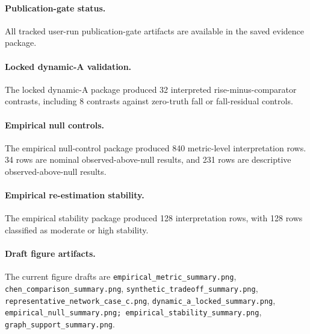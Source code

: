 \paragraph{Publication-gate status.}
All tracked user-run publication-gate artifacts are available in the saved evidence package.

\paragraph{Locked dynamic-A validation.}
The locked dynamic-A package produced 32 interpreted rise-minus-comparator contrasts, including 8 contrasts against zero-truth fall or fall-residual controls.

\paragraph{Empirical null controls.}
The empirical null-control package produced 840 metric-level interpretation rows. 34 rows are nominal observed-above-null results, and 231 rows are descriptive observed-above-null results.

\paragraph{Empirical re-estimation stability.}
The empirical stability package produced 128 interpretation rows, with 128 rows classified as moderate or high stability.

\paragraph{Draft figure artifacts.}
The current figure drafts are \texttt{empirical\_metric\_summary.png}, \texttt{chen\_comparison\_summary.png}, \texttt{synthetic\_tradeoff\_summary.png}, \texttt{representative\_network\_case\_c.png}, \texttt{dynamic\_a\_locked\_summary.png}, \texttt{empirical\_null\_summary.png; empirical\_stability\_summary.png}, \texttt{graph\_support\_summary.png}.
